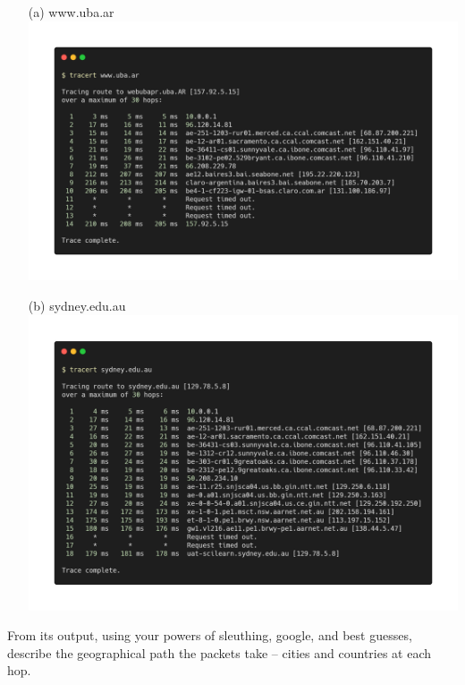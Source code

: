\documentclass[a4paper]{article}
\begin{document}
\begin{itemize}
	\item[(a)] www.uba.ar \\
	\includegraphics[scale=0.3]{trace-uba.png} 
	\item[(b)] sydney.edu.au \\
	\includegraphics[scale=0.3]{trace-sydney.png} 
\end{itemize}

From its output, using your powers of sleuthing, google, and best guesses, describe the geographical path the packets take -- cities and countries at each hop.
\end{document}
